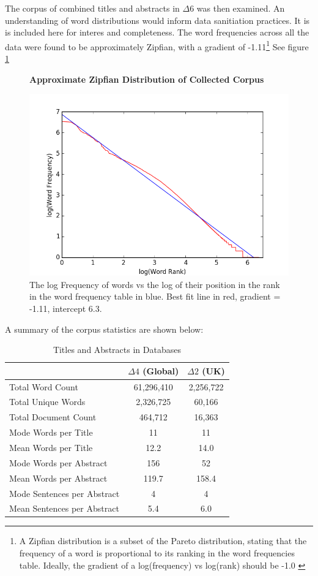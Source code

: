 The corpus of combined titles and abstracts in $\Delta6$ was then examined. An understanding of word distributions would inform data sanitiation practices. It is is included here for interes and completeness. The word frequencies across all the data were found to be approximately Zipfian, with a gradient of -1.11\footnote{A Zipfian distribution is a subset of the Pareto distribution, stating that the frequency of a word is proportional to its ranking in the word frequencies table. Ideally, the gradient of a log(frequency) vs log(rank) should be -1.0 \cite{zipf}} See figure \ref{fig:ZIPF}
\begin{figure}[H]
    \centering
    \textbf{Approximate Zipfian Distribution of Collected Corpus}\par\medskip
    \includegraphics[scale=0.5]{Data_Acquisition/zipf.png}
    \caption[Zipfian Plot of Collected Corpus]{The log Frequency of words vs the log of their position in the rank in the word frequency table in blue. Best fit line in red, gradient = -1.11, intercept 6.3. }
     \label{fig:ZIPF}
\end{figure}
A summary of the corpus statistics are shown below:
\begin{table}[h!]
\caption{Titles and Abstracts in Databases}
\label{tab:CORPUS STATS}
\begin{center}
\begin{tabular}{||l|c|c||}
\hline
&$\Delta4$ (Global)& $\Delta2$ (UK)\\
\hline
Total Word Count & 61,296,410 & 2,256,722 \\
Total Unique Words & 2,326,725 & 60,166\\
Total Document Count & 464,712 & 16,363\\
Mode Words per Title &  11 & 11\\
Mean Words per Title &  12.2 & 14.0\\
Mode Words per Abstract & 156 & 52\\
Mean Words per Abstract & 119.7 & 158.4\\
Mode Sentences per Abstract & 4 & 4\\
Mean Sentences per Abstract & 5.4 & 6.0\\
\hline
\end{tabular}
\end{center}
\end{table}
